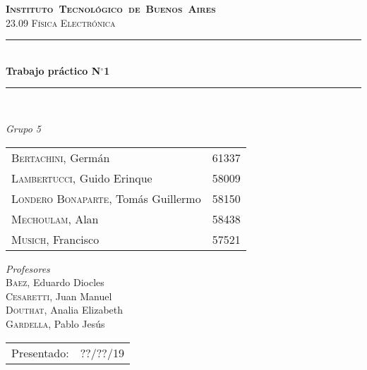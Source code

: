 \begin{titlepage}
\newcommand{\HRule}{\rule{\linewidth}{0.5mm}}
\center
\mbox{\textsc{\LARGE \bfseries {Instituto Tecnológico de Buenos Aires}}}\\[1.5cm]
\textsc{\Large 23.09 Física Electrónica}\\[0.5cm]

\HRule \\[0.6cm]
{ \Huge \bfseries Trabajo práctico N$^{\circ}$1}\\[0.4cm] 
\HRule \\[1.5cm]


{\large

\emph{Grupo 5}\\
\vspace{3px}

\begin{tabular}{lr}
\textsc{Bertachini}, Germán  & 61337 \\ 	
\textsc{Lambertucci}, Guido Erinque  & 58009 \\
\textsc{Londero Bonaparte}, Tomás Guillermo  & 58150 \\
\textsc{Mechoulam}, Alan  &  58438\\
\textsc{Musich}, Francisco  & 57521 \\

\end{tabular}

\vspace{20px}

\emph{Profesores}\\
\vspace{3px}
\textsc{Baez}, Eduardo Diocles\\ 	
\textsc{Cesaretti}, Juan Manuel\\ 
\textsc{Douthat}, Analia Elizabeth\\ 
\textsc{Gardella}, Pablo Jesús\\ 	

\vspace{100px}

\begin{tabular}{ll}

Presentado: & ??/??/19\\

\end{tabular}

}

\vfill

\end{titlepage}
